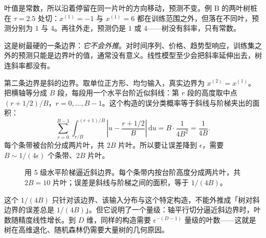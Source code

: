 \documentclass[11pt,a4paper,fontset=windows,zihao=-4]{ctexart}
\newcommand{\dd}{\mathrm{d}}
\begin{document}
叶值是常数，所以沿着停留在同一片叶的方向移动，预测不变。例 B 的两叶树桩在 $\tau=2.5$ 处切：$x^{(1)}=-1$ 与 $x^{(1)}=6$ 都在训练范围之外，但落在不同叶，预测分别为 $1$ 与 $4$。再往外走，预测仍是 $1$ 或 $4$——树没有斜率，只有常数。

这是树最硬的一条边界：\emph{它不会外推}。对时间序列、价格、趋势型响应，训练集之外的预测只能是边界叶的值，通常没有意义。线性模型至少会把斜率延伸出去，树连斜率都没有。

第二条边界是斜的边界。取单位正方形、均匀输入，真实边界为 $x^{(2)}=x^{(1)}$。把横轴等分成 $B$ 段，每段用一个水平台阶近似斜线：第 $r$ 段的高度取中点 $(r+1/2)/B$，$r=0,\dots,B-1$。这个构造的误分类概率等于斜线与阶梯夹出的面积：
\begin{equation}
  \sum_{r=0}^{B-1}
  \int_{r/B}^{(r+1)/B}
  \left|u-\frac{r+1/2}{B}\right|\,\dd u
  =B\cdot\frac{1}{4B^2}
  =\frac1{4B}.
  \label{eq:stair}
\end{equation}
每个条带被台阶分成两片叶，共 $2B$ 片叶。所以要让误差降到 $\epsilon$，需要 $B\sim1/(4\epsilon)$ 个条带、$2B$ 片叶。

\begin{figure}[htbp]
\centering
{}
\caption{用 5 级水平阶梯逼近斜边界。每个条带内按台阶高度分成两片叶，共 $2B=10$ 片叶；误差是斜线与阶梯之间的面积，等于 $1/(4B)$。}
\label{fig:stair}
\end{figure}

这个 $1/(4B)$ 只针对该边界、该输入分布与这个特定构造，不能外推成「树对斜边界的误差总是 $1/(4B)$」。但它说明了一个量级：轴平行切分逼近斜边界时，叶数随精度线性增长。到 $D$ 维，同样的构造需要 $\epsilon^{-(D-1)}$ 量级的叶数——这就是树在高维退化、随机森林仍需要大量树的几何原因。
\end{document}
